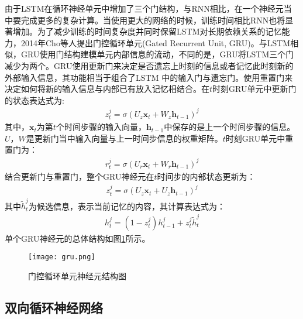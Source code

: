 由于LSTM在循环神经单元中增加了三个门结构，与RNN相比，在一个神经元当中要完成更多的复杂计算。当使用更大的网络的时候，训练时间相比RNN也将显著增加。为了减少训练的时间复杂度并同时保留LSTM对长期依赖关系的记忆能力，2014年Cho等人提出门控循环单元(Gated Recurrent Unit, GRU)。与LSTM相似，GRU使用门结构建模单元内部信息的流动，不同的是，GRU将LSTM三个门减少为两个。GRU使用更新门来决定是否遗忘上时刻的信息或者记忆此时刻新的外部输入信息，其功能相当于组合了LSTM 中的输入门与遗忘门。使用重置门来决定如何将新的输入信息与内部已有放入记忆相结合。在$t$时刻GRU单元中更新门的状态表达式为:
\begin{align} 
z_{t}^{j}=\sigma\left(U_{z} \mathbf{x}_{t}+W_{z} \mathbf{h}_{t-1}\right)^{j}
\end{align}
其中，$\mathbf{x}_{t}$为第$t$个时间步骤的输入向量，$\mathbf{h}_{t-1}$中保存的是上一个时间步骤的信息。$U$，$W$是更新门当中输入向量与上一时间步信息的权重矩阵。$t$时刻GRU单元中重置门为：
\begin{align} 
r_{t}^{j}=\sigma\left(U_{r} \mathbf{x}_{t}+W_{r} \mathbf{h}_{t-1}\right)^{j}
\end{align}
结合更新门与重置门，整个GRU神经元在$t$时间步的内部状态更新为：
\begin{align} 
z_{t}^{j}=\sigma\left(U_{z} \mathbf{x}_{t}+U_{z} \mathbf{h}_{t-1}\right)^{j}
\end{align}
其中$\tilde{h}_{t}^{j}$为候选信息，表示当前记忆的内容，其计算表达式为：
\begin{align} 
h_{t}^{j}=\left(1-z_{t}^{j}\right) h_{t-1}^{j}+z_{t}^{j} \tilde{h}_{t}^{j}
\end{align}
单个GRU神经元的总体结构如图\ref{fig:gru}所示。

\begin{figure}[htb]
  \centering
  \texttt{[image: gru.png]}\\
  \caption{门控循环单元神经元结构图}
  \label{fig:gru}
\end{figure}

\subsection{双向循环神经网络}

